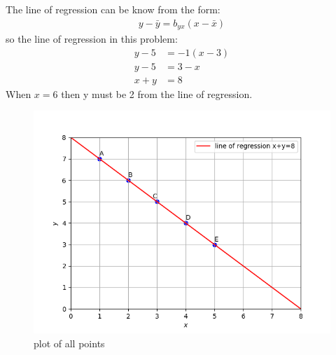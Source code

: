 \documentclass[journal,12pt,twocolumn]{IEEEtran}
\begin{document}
The line of regression can be know from the form:
\begin{align}
	y-\bar{y}=b_{yx}(x-\bar{x})
\end{align}
so the line of regression in this problem:
\begin{align}
	y-5&=-1(x-3)\\
	y-5&=3-x\\
	x+y&=8
\end{align}
When $x=6$ then y must be 2 from the line of regression.

\begin{figure}[h!]
		\centering
	\includegraphics[width=\columnwidth]{./figs/fig1.png}
	\caption{plot of all points}
	\label{Fig1}
	\end{figure}
\end{document}
